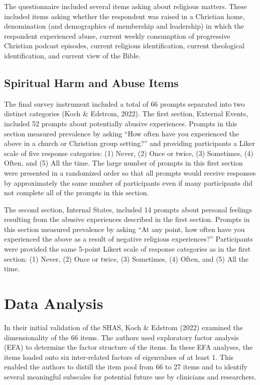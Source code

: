 \documentclass[
  letterpaper,
]{article}
\begin{document}
The questionnaire included several items asking about religious matters.
These included items asking whether the respondent was raised in a
Christian home, denomination (and demographics of membership and
leadership) in which the respondent experienced abuse, current weekly
consumption of progressive Christian podcast episodes, current religious
identification, current theological identification, and current view of
the Bible.

\subsection*{Spiritual Harm and Abuse
Items}\label{spiritual-harm-and-abuse-items}

The final survey instrument included a total of 66 prompts separated
into two distinct categories (Koch \& Edstrom, 2022). The first section,
External Events, included 52 prompts about potentially abusive
experiences. Prompts in this section measured prevalence by asking ``How
often have you experienced the above in a church or Christian group
setting?'' and providing participants a Liker scale of five response
categories: (1) Never, (2) Once or twice, (3) Sometimes, (4) Often, and
(5) All the time. The large number of prompts in this first section were
presented in a randomized order so that all prompts would receive
responses by approximately the same number of participants even if many
participants did not complete all of the prompts in this section.

The second section, Internal States, included 14 prompts about personal
feelings resulting from the abusive experiences described in the first
section. Prompts in this section measured prevalence by asking ``At any
point, how often have you experienced the above as a result of negative
religious experiences?'' Participants were provided the same 5-point
Likert scale of response categories as in the first section: (1) Never,
(2) Once or twice, (3) Sometimes, (4) Often, and (5) All the time.

\section*{Data Analysis}\label{data-analysis}


In their initial validation of the SHAS, Koch \& Edstrom (2022) examined
the dimensionality of the 66 items. The authors used exploratory factor
analysis (EFA) to determine the factor structure of the items. In these
EFA analyses, the items loaded onto six inter-related factors of
eigenvalues of at least 1. This enabled the authors to distill the item
pool from 66 to 27 items and to identify several meaningful subscales
for potential future use by clinicians and researchers.
\end{document}
